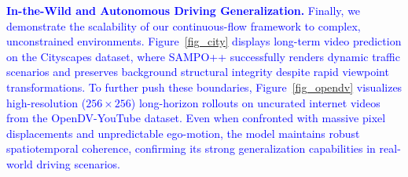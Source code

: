 \textcolor{blue}{\textbf{In-the-Wild and Autonomous Driving Generalization.} Finally, we demonstrate the scalability of our continuous-flow framework to complex, unconstrained environments. Figure~\ref{fig_city} displays long-term video prediction on the Cityscapes dataset, where SAMPO++ successfully renders dynamic traffic scenarios and preserves background structural integrity despite rapid viewpoint transformations. To further push these boundaries, Figure~\ref{fig_opendv} visualizes high-resolution ($256 \times 256$) long-horizon rollouts on uncurated internet videos from the OpenDV-YouTube dataset. Even when confronted with massive pixel displacements and unpredictable ego-motion, the model maintains robust spatiotemporal coherence, confirming its strong generalization capabilities in real-world driving scenarios.}
